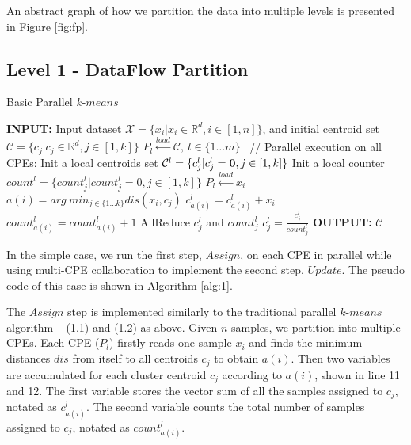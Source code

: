 An abstract graph of how we partition the data into multiple levels is presented in Figure \ref{fig:fp}. 

\subsection{Level 1 - DataFlow Partition}

\begin{algorithm}
\caption{Basic Parallel $k$-$means$}
\label{alg:1}
\begin{algorithmic}[1]
\STATE \textbf{INPUT:} Input dataset $\mathcal{X} = \{x_i | x_i\in\mathds{R}^d, i\in[1, n]\}$, and initial centroid set $\mathcal{C} = \{c_j | c_j\in\mathds{R}^d, j\in[1,k]\}$
\STATE $P_l \xleftarrow{load} \mathcal{C},\ l \in \{1 \ldots m\}$ %
\REPEAT
\STATE \ // Parallel execution on all CPEs:
\STATE Init a local centroids set $\mathcal{C}^{l} = \{c_j^l | c_j^l = \text{\textbf{0}}, j\in[1,k]\}$
\STATE Init a local counter $count^l = \{count_j^l | count_j^l = \text{0}, j\in[1,k]\}$
\STATE $P_l \xleftarrow{load} x_i$ %
\STATE $a(i) = arg\ min_{j \in \{1 \ldots k \} } dis(x_i, c_j)$
\STATE $c_{a(i)}^l = c_{a(i)}^l + x_i$
\STATE $count_{a(i)}^l =count_{a(i)}^l+1$
\ENDFOR
\STATE AllReduce $c_j^l$ and $count_j^l$
\STATE $c_j^l =  \frac{c_j^l}{count_j^l}$
\ENDFOR
\ENDFOR
{}
\STATE \textbf{OUTPUT:} $\mathcal{C}$
\end{algorithmic}
\end{algorithm}

In the simple case, we run the first step, $Assign$, on each CPE in parallel while using multi-CPE collaboration to implement the second step, $Update$. The pseudo code of this case is shown in Algorithm \ref{alg:1}.

The $Assign$ step is implemented similarly to the traditional parallel $k$-$means$ algorithm -- (1.1) and (1.2) as above. Given $n$ samples, we partition into multiple CPEs. Each CPE ($P_l$) firstly reads one sample $x_i$ and finds the minimum distances $dis$ from itself to all centroids $c_j$ to obtain $a(i)$.   
Then two variables are accumulated for each cluster centroid $c_j$ according to $a(i)$, shown in line 11 and 12. The first variable stores the vector sum of all the samples assigned to $c_j$, notated as $c_{a(i)}^l$. The second variable counts the total number of samples assigned to $c_j$, notated as $count_{a(i)}^l$. 

